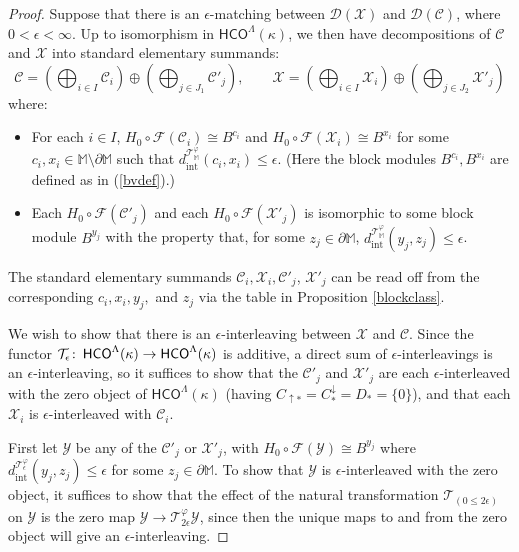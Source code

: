\documentclass[11pt]{amsart}
\theoremstyle{definition}
\theoremstyle{remark}
\numberwithin{equation}{section}
\def\co{\colon\thinspace}
\def\ep{\epsilon}
\begin{document}
\begin{proof}
	Suppose that there is an $\ep$-matching between $\mathcal{D}(\mathcal{X})$ and $\mathcal{D}(\mathcal{C})$, where $0<\ep<\infty$. Up to isomorphism in $\mathsf{HCO}^{\Lambda}(\kappa)$, we then have decompositions of $\mathcal{C}$ and $\mathcal{X}$ into standard elementary summands: \[ \mathcal{C}=\left(\bigoplus_{i\in I}\mathcal{C}_i\right)\oplus \left(\bigoplus_{j\in J_1}\mathcal{C}'_j\right),\qquad \mathcal{X}=\left(\bigoplus_{i\in I}\mathcal{X}_i\right)\oplus \left(\bigoplus_{j\in J_2}\mathcal{X}'_j\right) \] where: \begin{itemize} \item For each $i\in I$, $H_0\circ\mathcal{F}(\mathcal{C}_i)\cong B^{c_i}$ and $H_0\circ\mathcal{F}(\mathcal{X}_i)\cong B^{x_i}$ for some $c_i,x_i\in\mathbb{M}\setminus\partial\mathbb{M}$ such that $d_{\mathrm{int}}^{\mathcal{T}_{\mathbb{M}}^{\varphi}}(c_i,x_i)\leq \ep$.  (Here the block modules $B^{c_i},B^{x_i}$ are defined as in (\ref{bvdef}).)
		\item Each $H_0\circ\mathcal{F}(\mathcal{C}'_j)$ and each $H_0\circ \mathcal{F}(\mathcal{X}'_j)$ is isomorphic to some block module $B^{y_j}$ with the property that, for some $z_j\in\partial\mathbb{M}$,   $d_{\mathrm{int}}^{\mathcal{T}_{\mathbb{M}}^{\varphi}}(y_j,z_j)\leq\ep$. \end{itemize}
 The standard elementary summands $\mathcal{C}_i,\mathcal{X}_i,\mathcal{C}'_j$, $\mathcal{X}'_j$ can be read off from the corresponding $c_i,x_i,y_j,$ and $z_j$ via the table in Proposition \ref{blockclass}. 
 
 We wish to show that there is an $\ep$-interleaving between $\mathcal{X}$ and $\mathcal{C}$.  Since the functor $\mathcal{T}_{\ep}\co \mathsf{HCO}^{\Lambda}(\kappa)\to\mathsf{HCO}^{\Lambda}(\kappa)$ is additive, a direct sum of $\ep$-interleavings is an $\ep$-interleaving, so it suffices to show that the $\mathcal{C}'_j$ and $\mathcal{X}'_j$ are each $\ep$-interleaved with the zero object of $\mathsf{HCO}^{\Lambda}(\kappa)$ (having $C_{\uparrow *}=C^{\downarrow}_{*}=D_*=\{0\}$), and that each $\mathcal{X}_i$ is $\ep$-interleaved with $\mathcal{C}_i$.  
 
 First let $\mathcal{Y}$ be any of the $\mathcal{C}'_j$ or $\mathcal{X}'_j$, with $H_0\circ\mathcal{F}(\mathcal{Y})\cong B^{y_j}$ where $d_{\mathrm{int}}^{\mathcal{T}_{\ep}^{\varphi}}(y_j,z_j)\leq \ep$ for some $z_j\in\partial\mathbb{M}$.  To show that $\mathcal{Y}$ is $\ep$-interleaved with the zero object, it suffices to show that the effect of the natural transformation $\mathcal{T}_{(0\leq 2\ep)}$ on $\mathcal{Y}$ is the zero map $\mathcal{Y}\to \mathcal{T}^{\varphi}_{2\ep}\mathcal{Y}$, since then the unique maps to and from the zero object will give an $\ep$-interleaving.
 

\end{proof}
\end{document}
